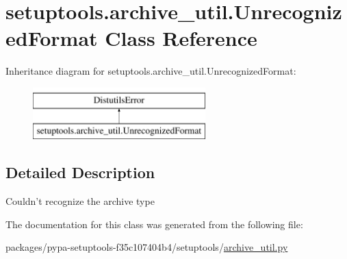 \hypertarget{classsetuptools_1_1archive__util_1_1UnrecognizedFormat}{}\section{setuptools.\+archive\+\_\+util.\+Unrecognized\+Format Class Reference}
\label{classsetuptools_1_1archive__util_1_1UnrecognizedFormat}
Inheritance diagram for setuptools.\+archive\+\_\+util.\+Unrecognized\+Format\+:\begin{figure}[H]
\begin{center}
\leavevmode
\includegraphics[height=2.000000cm]{classsetuptools_1_1archive__util_1_1UnrecognizedFormat}
\end{center}
\end{figure}


\subsection{Detailed Description}
\begin{DoxyVerb}Couldn't recognize the archive type\end{DoxyVerb}
 

The documentation for this class was generated from the following file\+:\begin{DoxyCompactItemize}
\item 
packages/pypa-\/setuptools-\/f35c107404b4/setuptools/\hyperlink{archive__util_8py}{archive\+\_\+util.\+py}\end{DoxyCompactItemize}
